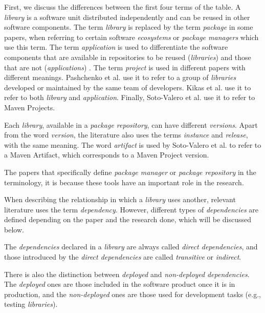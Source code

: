 \blankls
First, we discuss the differences between the first four terms of the table. A \textit{library} is a software unit distributed independently and can be reused in other software components. The term \textit{library} is replaced by the term \textit{package} in some papers, when referring to certain software \textit{ecosystems} or \textit{package managers} which use this term. The term \textit{application} is used to differentiate the software components that are available in repositories to be reused (\textit{libraries}) and those that are not (\textit{applications}) \cite{kikas2017structure}.
The term \textit{project} is used in different papers with different meanings. Pashchenko et al. \cite{pashchenko2018vulnerable} use it to refer to a group of \textit{libraries} developed or maintained by the same team of developers. Kikas et al. \cite{kikas2017structure} use it to refer to both \textit{library} and \textit{application}. Finally, Soto-Valero et al. use it to refer to Maven Projects.

Each \textit{library}, available in a \textit{package repository}, can have different \textit{versions}. Apart from the word \textit{version}, the literature also uses the terms \textit{instance} and \textit{release}, with the same meaning. The word \textit{artifact} is used by Soto-Valero et al. \cite{soto2020comprehensive} to refer to a Maven Artifact, which corresponds to a Maven Project version.

The papers that specifically define \textit{package manager} or \textit{package repository} in the terminology, it is because these tools have an important role in the research.

When describing the relationship in which a \textit{library} uses another, relevant literature uses the term \textit{dependency}. However, different types of \textit{dependencies} are defined depending on the paper and the research done, which will be discussed below.

The \textit{dependencies} declared in a \textit{library} are always called \textit{direct dependencies}, and those introduced by the \textit{direct dependencies} are called \textit{transitive} or \textit{indirect}.

There is also the distinction between \textit{deployed} and \textit{non-deployed} \textit{dependencies}. The \textit{deployed} ones are those included in the software product once it is in production, and the \textit{non-deployed} ones are those used for development tasks (e.g., testing \textit{libraries}).

